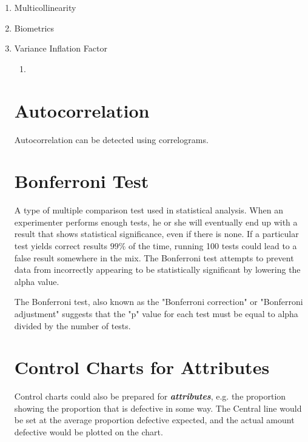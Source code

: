 \begin{enumerate}
	\item Multicollinearity
	\item Biometrics
	\item Variance Inflation Factor
	\begin{enumerate}
		\item 
	
	
	
\end{enumerate}
\newpage


\section{Autocorrelation}

Autocorrelation can be detected using correlograms.








\section{Bonferroni Test}

A type of multiple comparison test used in statistical analysis. When an experimenter performs enough tests, he or she will eventually end up with a result that shows statistical significance, even if there is none. If a particular test yields correct results $99\%$ of the time, running 100 tests could lead to a false result somewhere in the mix. The Bonferroni test attempts to prevent data from incorrectly appearing to be statistically significant by lowering the alpha value.

The Bonferroni test, also known as the "Bonferroni correction" or "Bonferroni adjustment" suggests that the "p" value for each test must be equal to alpha divided by the number of tests.
\section{Control Charts for Attributes}

Control charts could also be prepared for \emph{\textbf{attributes}}, e.g. the proportion
showing the proportion that is defective in some way.
The Central line would be set at the average proportion defective expected, and
the actual amount defective would be plotted on the chart.

\end{enumerate}
